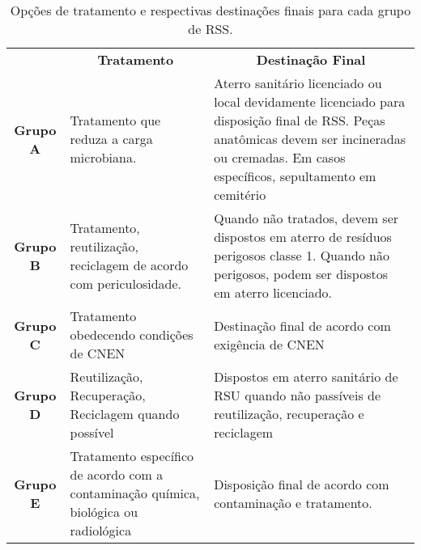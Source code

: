 \begin{table}[htbp]
  \centering
  \caption{ Opções de tratamento e respectivas destinações finais para cada grupo de RSS.}
    \begin{tabular}{c|p{12.07em}|p{20.57em}}
    \rowcolor[rgb]{ .929,  .49,  .192} \multicolumn{1}{c}{\textcolor[rgb]{ 1,  1,  1}{}} & \multicolumn{1}{c}{\textcolor[rgb]{ 1,  1,  1}{\textbf{Tratamento}}} & \multicolumn{1}{c}{\textcolor[rgb]{ 1,  1,  1}{\textbf{Destinação Final}}} \\
    \rowcolor[rgb]{ .957,  .69,  .514} \textbf{Grupo A} & Tratamento que reduza a carga microbiana. & Aterro sanitário licenciado ou local devidamente licenciado para disposição final de RSS. Peças anatômicas devem ser incineradas ou cremadas. Em casos específicos, sepultamento em cemitério \\
    \rowcolor[rgb]{ .984,  .894,  .835} \textbf{Grupo B} & Tratamento, reutilização, reciclagem de acordo com periculosidade. & Quando não tratados, devem ser dispostos em aterro de resíduos perigosos classe 1. Quando não perigosos, podem ser dispostos em aterro licenciado. \\
    \rowcolor[rgb]{ .957,  .69,  .514} \textbf{Grupo C} & Tratamento obedecendo condições de CNEN & Destinação final de acordo com exigência de CNEN \\
    \rowcolor[rgb]{ .992,  .914,  .851} \textbf{Grupo D} & Reutilização, Recuperação, Reciclagem quando possível & Dispostos em aterro sanitário de RSU quando não passíveis de reutilização, recuperação e reciclagem \\
    \rowcolor[rgb]{ .957,  .69,  .514} \textbf{Grupo E} & Tratamento específico de acordo com a contaminação química, biológica ou radiológica & Disposição final de acordo com contaminação e tratamento. \\
    \end{tabular}%
  \label{tab:tratamento_rss}%
\end{table}%

